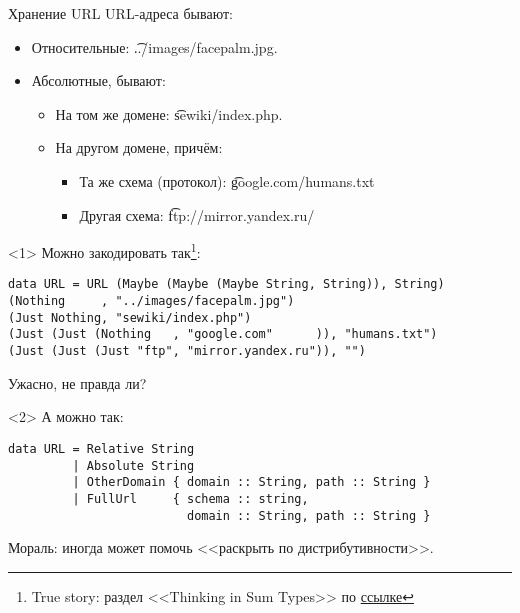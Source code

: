 \begin{frame}[t,fragile]{Хранение URL}
	URL-адреса бывают:
	\begin{itemize}
		\item Относительные: \t{../images/facepalm.jpg}.
		\item Абсолютные, бывают:
			\begin{itemize}
				\item На том же домене: \t{sewiki/index.php}.
				\item На другом домене, причём:
					\begin{itemize}
						\item Та же схема (протокол): \t{google.com/humans.txt}
	                    \item Другая схема: \t{ftp://mirror.yandex.ru/}
                   	\end{itemize}
			\end{itemize}
	\end{itemize}
\begin{onlyenv}<1>
	Можно закодировать так\footnote{True story: раздел <<Thinking in Sum Types>> по \href{https://chadaustin.me/2015/07/sum-types/}{ссылке}}:
\begin{verbatim}
data URL = URL (Maybe (Maybe (Maybe String, String)), String)
(Nothing     , "../images/facepalm.jpg")
(Just Nothing, "sewiki/index.php")
(Just (Just (Nothing   , "google.com"      )), "humans.txt")
(Just (Just (Just "ftp", "mirror.yandex.ru")), "")
\end{verbatim}
Ужасно, не правда ли?
\end{onlyenv}

\begin{onlyenv}<2>
А можно так:
\begin{verbatim}
data URL = Relative String
         | Absolute String
         | OtherDomain { domain :: String, path :: String }
         | FullUrl     { schema :: string,
                         domain :: String, path :: String }
\end{verbatim}
Мораль: иногда может помочь <<раскрыть по дистрибутивности>>.
\end{onlyenv}
\end{frame}

